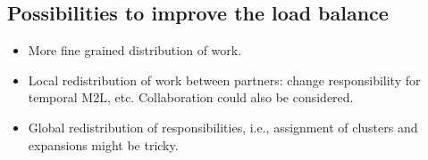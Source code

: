 \documentclass[a4paper,11pt]{article}
\theoremstyle{plain}
\theoremstyle{definition}
\theoremstyle{remark}
\begin{document}
\subsection{Possibilities to improve the load balance}
\begin{itemize}
  \item More fine grained distribution of work.
  \item Local redistribution of work between partners: change responsibility for temporal M2L, etc. Collaboration could also be considered.
  \item Global redistribution of responsibilities, i.e., assignment of clusters and expansions might be tricky.
\end{itemize}
\end{document}
